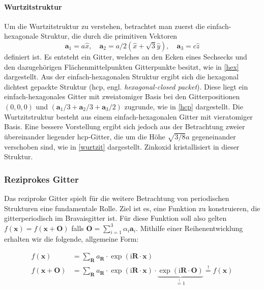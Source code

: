 \paragraph{Wurtzitstruktur}
Um die Wurtzitstruktur zu verstehen, betrachtet man zuerst die einfach-hexagonale Struktur, die durch die primitiven
Vektoren
\begin{equation*}
    \mathbf{a}_1 = a\hat{x}, \quad
    \mathbf{a}_2 = a/2 (\hat{x} + \sqrt{3} \hat{y}), \quad
    \mathbf{a}_3 = c \hat{z}
\end{equation*}
definiert ist.
Es entsteht ein Gitter, welches an den Ecken eines Sechsecks und den dazugehörigen Flächenmittelpunkten Gitterpunkte
besitzt, wie in \cref{hex} dargestellt.
Aus der einfach-hexagonalen Struktur ergibt sich die hexagonal dichtest gepackte Struktur
(hcp, engl. \textit{hexagonal-closed packet}).
Diese liegt ein einfach-hexagonales Gitter mit zweiatomiger Basis bei den Gitterpositionen $(0,0,0)$ und
$(\mathbf{a}_1/3 + \mathbf{a}_2/3 + \mathbf{a}_3/2)$ zugrunde, wie in \cref{hcp} dargestellt.\autocite[97-98]{Ashcroft}
Die Wurtzitstruktur besteht aus einem einfach-hexagonalen Gitter mit vieratomiger Basis.
Eine bessere Vorstellung ergibt sich jedoch aus der Betrachtung zweier übereinander liegender hcp-Gitter, die um
die Höhe $\sqrt {3 / 8} a$ gegeneinander verschoben sind, wie in \cref{wurtzit} dargestellt.
Zinkoxid  kristallisiert in dieser Struktur.

\subsubsection{Reziprokes Gitter}
Das reziproke Gitter spielt für die weitere Betrachtung von periodischen Strukturen eine fundamentale Rolle.
Ziel ist es, eine Funktion zu konstruieren, die gitterperiodisch im Bravaisgitter ist.
Für diese Funktion soll also gelten
$f(\mathbf{x})=f(\mathbf{x}+\mathbf{O})$ falls $\mathbf{O}=\sum_{i=1}^{3} \alpha_{i}\mathbf{a}_{i}$.
Mithilfe einer Reihenentwicklung erhalten wir die folgende, allgemeine Form:

\begin{align*}
    f(\mathbf{x})&=\sum_{\mathbf{R}}a_{\mathbf{R}}\cdot \exp(\mathrm{i}\mathbf{R}\cdot\mathbf{x}) \\
    f(\mathbf{x}+\mathbf{O})&=\sum_{\mathbf{R}}a_{\mathbf{R}}\cdot \exp(\mathrm{i}\mathbf{R}\cdot \mathbf{x})\cdot
    \underbrace{ \exp(\mathrm{i}\mathbf{R}\cdot \mathbf{O}) }_{ \stackrel{!}{=}1 }  \stackrel{!}{=} f(\mathbf{x})
\end{align*}

